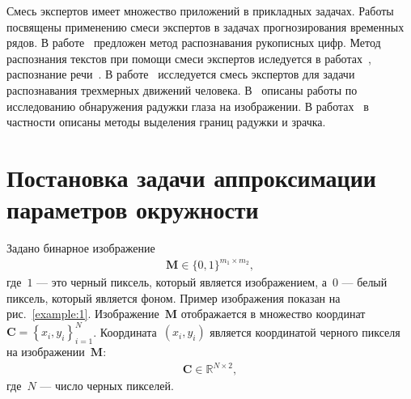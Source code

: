 \documentclass[12pt, twoside]{article}
\numberwithin{equation}{section}
\begin{document}
Смесь экспертов имеет множество приложений в прикладных задачах. Работы~\cite{Yumlu2003, Cheung1995, Weigend2000} посвящены применению смеси экспертов в задачах прогнозирования временных рядов. 
В работе~\cite{Ebrahimpour2009} предложен метод распознавания рукописных цифр. 
Метод распознания текстов при помощи смеси экспертов иследуется в работах~\cite{Estabrooks2001}, распознание речи~\cite{Mossavat2010, Peng1996, Tuerk2001}. 
В работе~\cite{Sminchisescu2007} исследуется смесь экспертов для задачи распознавания трехмерных движений человека. 
В~\cite{Bowyer2010} описаны работы по исследованию обнаружения радужки глаза на изображении. В работах~\cite{Matveev2010, Matveev2014} в частности описаны методы выделения границ радужки и зрачка.

\section{Постановка задачи аппроксимации параметров окружности}
Задано бинарное изображение
\[
\label{eq:st:cr:1}
\begin{aligned}
\textbf{M} \in \{0,1\}^{m_1 \times m_2},
\end{aligned}
\]
где~$1$ --- это черный пиксель, который является изображением, а~$0$ --- белый пиксель, который является фоном. 
Пример изображения показан на рис.~\ref{example:1}.
Изображение~$\textbf{M}$ отображается в множество координат~\mbox{$\textbf{C}=\left\{x_i, y_i\right\}_{i=1}^{N}$}. Координата~$(x_i, y_i)$ является координатой черного пикселя на изображении~$\textbf{M}$:
\[
\label{eq:st:cr:2}
\begin{aligned}
\textbf{C} \in  \mathbb{R}^{N \times 2},
\end{aligned}
\]
где~$N$ --- число черных пикселей.
\end{document}
